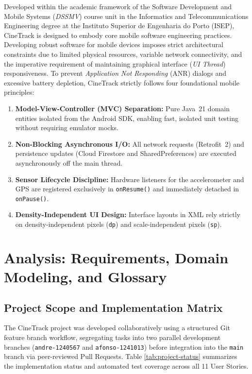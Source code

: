 \documentclass[runningheads,a4paper]{llncs}
\begin{document}
Developed within the academic framework of the Software Development and Mobile Systems (\textit{DSSMV}) course unit in the Informatics and Telecommunications Engineering degree at the Instituto Superior de Engenharia do Porto (ISEP), CineTrack is designed to embody core mobile software engineering practices. Developing robust software for mobile devices imposes strict architectural constraints due to limited physical resources, variable network connectivity, and the imperative requirement of maintaining graphical interface (\textit{UI Thread}) responsiveness. To prevent \textit{Application Not Responding} (ANR) dialogs and excessive battery depletion, CineTrack strictly follows four foundational mobile principles:
\begin{enumerate}[label=\textbf{\arabic*.}]
    \item \textbf{Model-View-Controller (MVC) Separation:} Pure Java~21 domain entities isolated from the Android SDK, enabling fast, isolated unit testing without requiring emulator mocks.
    \item \textbf{Non-Blocking Asynchronous I/O:} All network requests (Retrofit~2) and persistence updates (Cloud Firestore and SharedPreferences) are executed asynchronously off the main thread.
    \item \textbf{Sensor Lifecycle Discipline:} Hardware listeners for the accelerometer and GPS are registered exclusively in \texttt{onResume()} and immediately detached in \texttt{onPause()}.
    \item \textbf{Density-Independent UI Design:} Interface layouts in XML rely strictly on density-independent pixels (\texttt{dp}) and scale-independent pixels (\texttt{sp}).
\end{enumerate}

\newpage

\section{Analysis: Requirements, Domain Modeling, and Glossary}

\subsection{Project Scope and Implementation Matrix}
The CineTrack project was developed collaboratively using a structured Git feature branch workflow, segregating tasks into two parallel development branches (\texttt{andre-1240567} and \texttt{afonso-1241013}) before integration into the \texttt{main} branch via peer-reviewed Pull Requests. Table \ref{tab:project-status} summarizes the implementation status and automated test coverage across all 11 User Stories.
\end{document}
